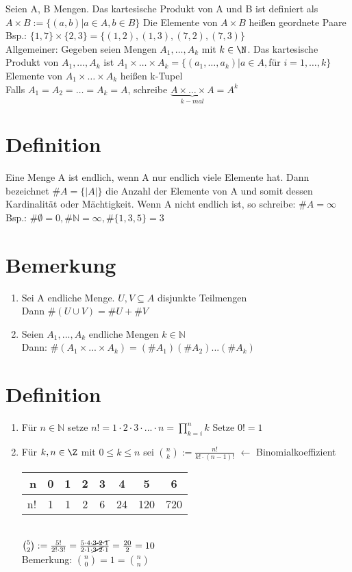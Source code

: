 \Def
Seien A, B Mengen. Das kartesische Produkt von A und B ist definiert als $A × B := \{(a,b)|a\in A, b \in B\}$ Die Elemente von $A × B$ heißen geordnete Paare\\
Bsp.: $\{1,7\}\times \{2,3\}=\{(1,2),(1,3),(7,2),(7,3)\}$\\
Allgemeiner: Gegeben seien Mengen
$A_1,…,A_k$ mit $k \in \N$. Das kartesische Produkt von $A_1,…,A_k$ ist $A_1\times …\times A_k = \{(a_1,…,a_k)|a\in A, $für $i=1,…,k\}$\\
Elemente von $A_1 × … × A_k$ heißen k-Tupel\\
Falls $A_1=A_2=…=A_k=A$, schreibe $\underbrace{A\times…\times A}_{k-mal}=A^k$

\section{Definition}
Eine Menge A ist endlich, wenn A nur endlich viele Elemente hat. Dann bezeichnet
$\#A = \{|A|\}$ die Anzahl der Elemente von A und somit dessen Kardinalit\"at
oder M\"achtigkeit. Wenn A nicht endlich ist, so schreibe: $\# A= \infty$\\
Bsp.: $\#\emptyset = 0, \#\mathds{N}=\infty, \# \{1,3,5\} = 3$

\section{Bemerkung}
\begin{enumerate}
\item Sei A endliche Menge. $U,V\subseteq A$ disjunkte Teilmengen\\
Dann $\#(U\cup V)=\# U + \# V$ 
\item Seien $A_1,...,A_k$ endliche Mengen $k \in \mathds{N}$\\
Dann: $\#(A_1 \times ... \times A_k)=(\#A_1)(\#A_2)...(\#A_k)$
\end{enumerate}

\section{Definition}
\begin{enumerate}
\item Für $n\in \mathds{N}$ setze $n!=1\cdot 2\cdot 3\cdot ... \cdot n=\prod_{k=i}^n k$
Setze $0!=1$
\item Für $k,n\in \Z$ mit $0\le k \le n$ sei ${n \choose k} := \frac{n!}{k!\cdot(n-1)!}$ $\leftarrow$ Binomialkoeffizient\\
\begin{tabular}{r|c|c|c|c|c|c|c}
n & 0 & 1 & 2 & 3 & 4 & 5 & 6\\ \hline
n! & 1 & 1 & 2 & 6 & 24 & 120 & 720
\end{tabular}\\
\bsp
${5 \choose 2} := \frac{5!}{2!\cdot 3!} = \frac{5\cdot 4 \cdot\cancel{3 \cdot 2 \cdot 1}}{2\cdot 1\cdot \cancel{3\cdot 2}\cdot 1 } = \frac{20}{2}=10$\\
Bemerkung: ${ n \choose 0 }= 1 = {n \choose n}$
\end{enumerate}